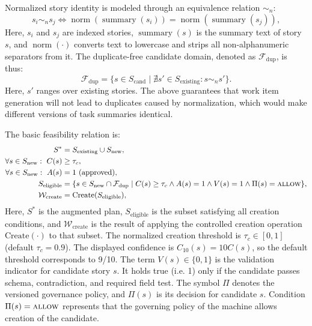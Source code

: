 \documentclass[manuscript,review]{acmart}
\begin{document}
Normalized story identity is modeled through an equivalence relation $\sim_n$:
\begin{equation}
s_i \sim_n s_j \iff \operatorname{norm}(\operatorname{summary}(s_i)) =
\operatorname{norm}(\operatorname{summary}(s_j)),
\end{equation}
Here, $s_i$ and $s_j$ are indexed stories, $\operatorname{summary}(s)$ is the summary text of story $s$, and $\operatorname{norm}(\cdot)$ converts text to lowercase and strips all non-alphanumeric separators from it. The duplicate-free candidate domain, denoted as $\mathcal{F}_{\mathrm{dup}}$, is thus:
\begin{equation}
\mathcal{F}_{\mathrm{dup}}=\{s\in S_{\text{cand}}\mid \nexists s'\in S_{\text{existing}}: s\sim_n s'\}.
\end{equation}
Here, $s'$ ranges over existing stories. The above guarantees that work item generation will not lead to duplicates caused by normalization, which would make different versions of task summaries identical.

The basic feasibility relation is:
\begin{align}
S^* &= S_{\text{existing}} \cup S_{\text{new}}, \\
\forall s \in S_{\text{new}}:~ C(s) &\geq \tau_c, \\
\forall s \in S_{\text{new}}:~ A(s) &= 1 \text{ (approved)}, \\
S_{\text{eligible}} &= \{ s \in S_{\text{new}}\cap\mathcal{F}_{\mathrm{dup}} \mid C(s)\ge \tau_c \land A(s)=1 \land V(s)=1 \land \Pi(s)=\textsc{allow} \}, \\
\mathcal{W}_{\text{create}} &= \text{Create}(S_{\text{eligible}}),
\end{align}
Here, $S^*$ is the augmented plan, $S_{\text{eligible}}$ is the subset satisfying all creation conditions, and $\mathcal{W}_{\text{create}}$ is the result of applying the controlled creation operation $\text{Create}(\cdot)$ to that subset. The normalized creation threshold is $\tau_c\in[0,1]$ (default $\tau_c=0.9$). The displayed confidence is $C_{10}(s)=10C(s)$, so the default threshold corresponds to 9/10. The term
$V(s)\in\{0,1\}$ is the validation indicator for candidate story $s$.
It holds true (i.e. 1) only if the candidate passes schema, contradiction, and required field test. The symbol $\Pi$ denotes the versioned governance policy, and $\Pi(s)$ is its decision for candidate $s$. Condition $\Pi(s)=\textsc{allow}$ represents that the governing policy of the machine allows creation of the candidate.
\end{document}
